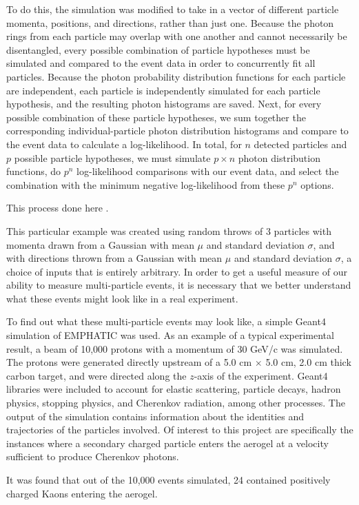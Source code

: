 To do this, the simulation was modified to take in a vector of different particle momenta, positions, and directions, rather than just one.
Because the photon rings from each particle may overlap with one another and cannot necessarily be disentangled, every possible combination of particle hypotheses must be simulated and compared to the event data in order to concurrently fit all particles.
Because the photon probability distribution functions for each particle are independent, each particle is independently simulated for each particle hypothesis, and the resulting photon histograms are saved.
Next, for every possible combination of these particle hypotheses, we sum together the corresponding individual-particle photon distribution histograms and compare to the event data to calculate a log-likelihood.
In total, for $n$ detected particles and $p$ possible particle hypotheses, we must simulate $p \times n$ photon distribution functions, do $p^n$  log-likelihood comparisons with our event data, and select the combination with the minimum negative log-likelihood from these $p^n$ options. 

This process done here .

This particular example was created using random throws of 3 particles with momenta drawn from a Gaussian with mean $\mu$ and standard deviation $\sigma$, and with directions thrown from a Gaussian with mean $\mu$ and standard deviation $\sigma$, a choice of inputs that is entirely arbitrary.
In order to get a useful measure of our ability to measure multi-particle events, it is necessary that we better understand what these events might look like in a real experiment.

To find out what these multi-particle events may look like, a simple Geant4 simulation of EMPHATIC was used.
As an example of a typical experimental result, a beam of 10,000 protons with a momentum of 30 GeV/c was simulated.
The protons were generated directly upstream of a 5.0 cm $\times$ 5.0 cm, 2.0 cm thick carbon target, and were directed along the $z$-axis of the experiment.
Geant4 libraries were included to account for elastic scattering, particle decays, hadron physics, stopping physics, and Cherenkov radiation, among other processes. 
The output of the simulation contains information about the identities and trajectories of the particles involved. 
Of interest to this project are specifically the instances where a secondary charged particle enters the aerogel at a velocity sufficient to produce Cherenkov photons.




It was found that out of the 10,000 events simulated, 24 contained positively charged Kaons entering the aerogel.


\endinput

Any text after an \endinput is ignored.
You could put scraps here or things in progress.
